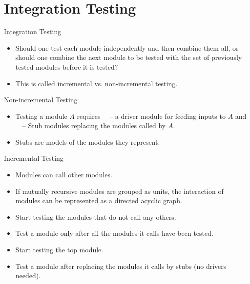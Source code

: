 \section{Integration Testing}

\begin{frame}{Integration Testing}
  \begin{itemize}
    \item Should one test each module independently and then combine them all,
or should one combine the next module to be tested with the set of previously tested modules before it is tested?
    \item This is called \alert{incremental} vs. \alert{non-incremental} testing.
  \end{itemize}
\end{frame}

\begin{Frame}{Non-incremental Testing}
  \begin{itemize}
    \item Testing a module $A$ requires\newline
      \ \ -- a \alert{driver module} for feeding inputs to $A$ and \newline
      \ \ -- \alert{Stub modules} replacing the modules called by $A$.
    \item Stubs are \alert{models} of the modules they represent.
  \end{itemize}
\end{Frame}

\begin{Frame}{Incremental Testing}
  \begin{itemize}
    \item Modules can call other modules.
    \item If mutually recursive modules are grouped as units, the interaction
    of modules can be represented as a \alert{directed acyclic graph}.
  \end{itemize}

  \xxx

  \begin{itemize}
    \item Start testing the modules that do not call any others.
    \item Test a module only after all the modules it calls have been tested.
  \end{itemize}

  \xxx

  \begin{itemize}
    \item Start testing the top module.
    \item Test a module after replacing the modules it calls by stubs (no drivers needed).
  \end{itemize}
\end{Frame}

